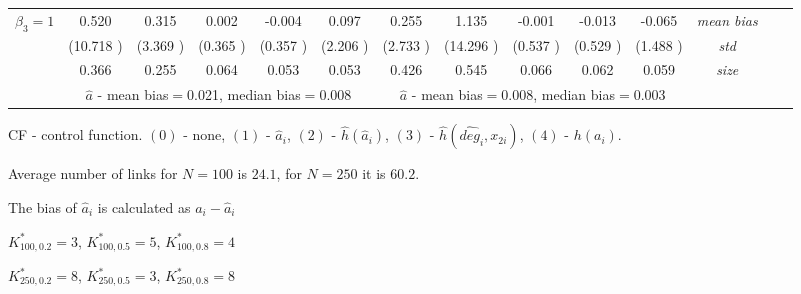 \begin{table}
\begin{threeparttable}
{\begin{tabular}{|c|c|c|c|c|c|c|c|c|c|c|c|c|c|}
\multirow{4}{*}{$\beta_3=1$}& 0.520 & 0.315 &0.002& -0.004 &0.097 &0.255 &1.135 &-0.001 &-0.013& -0.065 &\textit{mean bias} \\ 
&(10.718 )&(3.369 )&(0.365 )&(0.357 )&(2.206 )&(2.733 )&(14.296 )&(0.537 )&(0.529 )&(1.488 )&\textit{std}\\ 
& 0.366 & 0.255 &0.064 &0.053 &0.053 &0.426& 0.545& 0.066 &0.062 &0.059 &\textit{size} \\\midrule 
&\multicolumn{5}{|c|}{$\hat{a}$ - mean bias$=$0.021, median bias$=$0.008 }&\multicolumn{5}{|c|}{$\hat{a}$ - mean bias$=$0.008, median bias$=$0.003 }&\\ \hline 
\end{tabular}} 
\begin{tablenotes}\tiny 
\item CF - control function. $(0)$ - none, $(1)$ - $\hat{a}_i$,  $(2)$ - $\hat{h}(\hat{a}_i)$, $(3)$ - $\hat{h}(\widehat{deg}_i,x_{2i})$, $(4)$ - $h(a_i)$. 
\item Average number of links for $N=100$ is $24.1$, for $N=250$ it is $60.2$. 
\item The bias of $\hat{a}_i$ is calculated as $a_i-\hat{a}_i$ 
\item $K^*_{100,0.2}=3$, $K^*_{100,0.5}=5$, $K^*_{100,0.8}=4$ 
\item $K^*_{250,0.2}=8$, $K^*_{250,0.5}=3$, $K^*_{250,0.8}=8$ 
  \end{tablenotes} 
\end{threeparttable} 
\end{table} 
